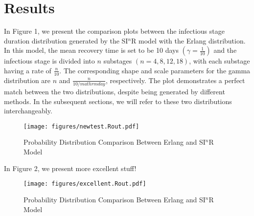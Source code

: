 \documentclass[12pt]{article}
\newcommand{\perday}{\ensuremath{/mathrm{day}}}
\begin{document}
\section{Results}

In Figure 1, we present the comparison plots between the infectious stage duration distribution generated by the SI$^n$R model with the Erlang distribution. In this model, the mean recovery time is set to be 10 days $(\gamma = \frac{1}{10})$ and the infectious stage is divided into $n$ substages $(n = 4, 8, 12, 18)$, with each substage having a rate of $\frac{n}{10}$. The corresponding shape and scale parameters for the gamma distribution are $n$ and $\frac{n}{10\perday}$, respectively. The plot demonstrates a perfect match between the two distributions, despite being generated by different methods. In the subsequent sections, we will refer to these two distributions interchangeably.
\begin{figure}[h]
    \centering
    \texttt{[image: figures/newtest.Rout.pdf]}
    \caption{Probability Distribution Comparison Between Erlang and SI$^n$R Model}
\end{figure}

In Figure 2, we present more excellent stuff!
\begin{figure}[h]
    \centering
    \texttt{[image: figures/excellent.Rout.pdf]}
    \caption{Probability Distribution Comparison Between Erlang and SI$^n$R Model}
\end{figure}


 
\end{document}
